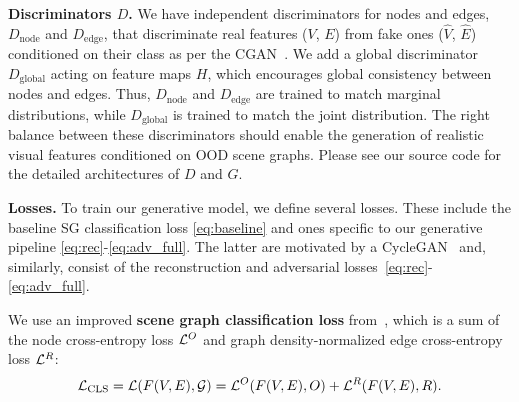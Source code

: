 \textbf{Discriminators $D$.}
We have independent discriminators for nodes and edges, $D_{\text{node}}$ and  $D_{\text{edge}}$, that discriminate real features ($V$, $E$) from fake ones ($\hat{V}$, $\hat{E}$) conditioned on their class as per the CGAN~\citep{mirza2014conditional,radford2015unsupervised}. We add a global discriminator $D_{\text{global}}$ acting on feature maps $H$, which encourages global consistency between nodes and edges.
Thus, $D_{\text{node}}$ and $D_{\text{edge}}$ are trained to match marginal distributions, while $D_{\text{global}}$ is trained to match the joint distribution. The right balance between these discriminators should enable the generation of realistic visual features conditioned on OOD scene graphs. Please see our source code for the detailed architectures of $D$ and $G$.

\textbf{Losses.}
To train our generative model, we define several losses. These include the baseline SG classification loss \eqref{eq:baseline} and ones specific to our generative pipeline \eqref{eq:rec}-\eqref{eq:adv_full}. The latter are motivated by a CycleGAN~\citep{zhu2017unpaired} and, similarly, consist of the reconstruction and adversarial losses~\eqref{eq:rec}-\eqref{eq:adv_full}. 

We use an improved \textbf{scene graph classification loss} from~\citep{knyazev2020graph}, which is a sum of the node cross-entropy loss ${\cal L}^{O}$ and graph density-normalized edge cross-entropy loss ${\cal L}^{R}$:
%
\begin{align}
\label{eq:baseline}
{\cal L}_\text{CLS} = {\cal L}(F(V, E), \mathit{\cal G}) = {\cal L}^{O}(F( V, E), O) + {\cal L}^{R}(F( V, E), R).
\end{align}
%

